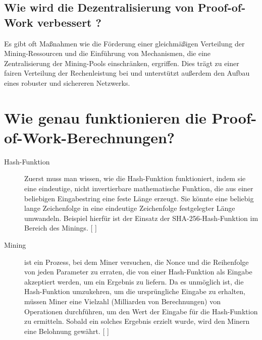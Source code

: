 \documentclass[ngerman]{scrreprt}
\begin{document}
\subsection{Wie wird die Dezentralisierung von Proof-of-Work verbessert ?}
Es gibt oft Maßnahmen wie die Förderung einer gleichmäßigen Verteilung der Mining-Ressourcen und die Einführung von Mechanismen, die eine Zentralisierung der Mining-Pools einschränken, ergriffen. Dies trägt zu einer fairen Verteilung der Rechenleistung bei und unterstützt außerdem den Aufbau eines robuster und sichereren Netzwerks.

\section{Wie genau funktionieren die Proof-of-Work-Berechnungen?}

\begin{description}
	\item[Hash-Funktion] Zuerst muss man wissen, wie die Hash-Funktion funktioniert, indem sie eine eindeutige, nicht invertierbare mathematische Funktion, die aus einer beliebigen Eingabestring eine feste Länge erzeugt. Sie könnte eine beliebig lange Zeichenfolge in eine eindeutige Zeichenfolge festgelegter Länge umwandeln. Beispiel hierfür ist der Einsatz der SHA-256-Hash-Funktion im Bereich des Minings. [ \cite{btc-echo-proof-of-work} ]
	\item[Mining] ist ein Prozess, bei dem Miner versuchen, die Nonce und die Reihenfolge von jeden Parameter zu erraten, die von einer Hash-Funktion als Eingabe akzeptiert werden, um ein Ergebnis zu liefern. Da es unmöglich ist, die Hash-Funktion umzukehren, um die ursprüngliche Eingabe zu erhalten, müssen Miner eine Vielzahl (Milliarden von Berechnungen) von Operationen durchführen, um den Wert der Eingabe für die Hash-Funktion zu ermitteln. Sobald ein solches Ergebnis erzielt wurde, wird den Minern eine Belohnung gewährt. [ \cite{btc-echo-proof-of-work} ]
\end{description}
\end{document}
